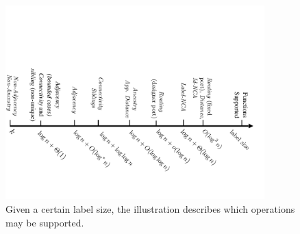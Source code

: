 				\begin{figure}
				\centering
				\includegraphics[width=100mm]{./Figures/Hierarchy2.pdf}
				\caption{Given a certain label size, the illustration describes  which operations may be  supported.  }
				\label{fig:complexityruler}
			\end{figure}
			

